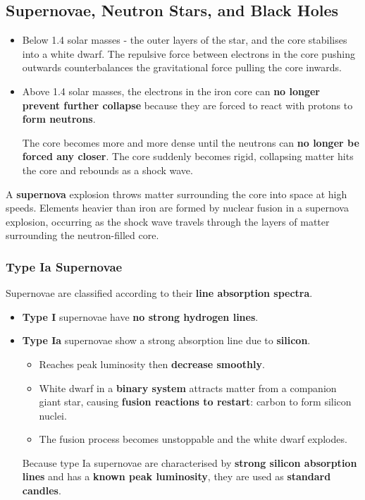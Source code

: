 \subsection{Supernovae, Neutron Stars, and Black Holes}

\begin{itemize}
    \item Below 1.4 solar masses - the outer layers of the star, and the core stabilises into a white dwarf. The repulsive force between electrons in the core pushing outwards counterbalances the gravitational force pulling the core inwards.
    \item Above 1.4 solar masses, the electrons in the iron core can \textbf{no longer prevent further collapse} because they are forced to react with protons to \textbf{form neutrons}.

        The core becomes more and more dense until the neutrons can \textbf{no longer be forced any closer}. The core suddenly becomes rigid, collapsing matter hits the core and rebounds as a shock wave.
\end{itemize}

A \textbf{supernova} explosion throws matter surrounding the core into space at high speeds. Elements heavier than iron are formed by nuclear fusion in a supernova explosion, occurring as the shock wave travels through the layers of matter surrounding the neutron-filled core.

\subsubsection*{Type Ia Supernovae}

Supernovae are classified according to their \textbf{line absorption spectra}.
\begin{itemize}
    \item \textbf{Type I} supernovae have \textbf{no strong hydrogen lines}.
    \item \textbf{Type Ia} supernovae show a strong absorption line due to \textbf{silicon}.
        \begin{itemize}
            \item Reaches peak luminosity then \textbf{decrease smoothly}.
            \item White dwarf in a \textbf{binary system} attracts matter from a companion giant star, causing \textbf{fusion reactions to restart}: carbon to form silicon nuclei.
            \item The fusion process becomes unstoppable and the white dwarf explodes.
        \end{itemize}

        Because type Ia supernovae are characterised by \textbf{strong silicon absorption lines} and has a \textbf{known peak luminosity}, they are used as \textbf{standard candles}.
\end{itemize}

